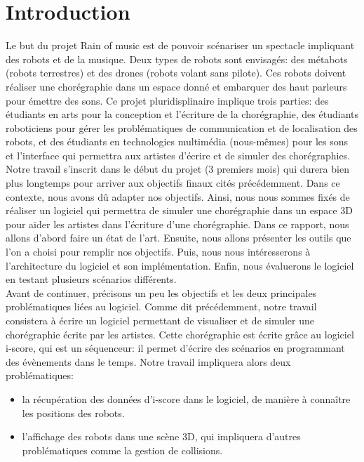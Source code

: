 \section*{Introduction}

Le but du projet Rain of music est de pouvoir scénariser un spectacle impliquant des robots et de la musique. Deux types de robots sont envisagés: des métabots (robots terrestres) et des drones (robots volant sans pilote). Ces robots doivent réaliser une chorégraphie dans un espace donné et embarquer des haut parleurs pour émettre des sons. Ce projet pluridisplinaire implique trois parties: des étudiants en arts pour la conception et l'écriture de la chorégraphie, des étudiants roboticiens pour gérer les problématiques de communication et de localisation des robots, et des étudiants en technologies multimédia (nous-mêmes) pour les sons et l'interface qui permettra aux artistes d'écrire et de simuler des chorégraphies. \\

Notre travail s'inscrit dans le début du projet (3 premiers mois) qui durera bien plus longtemps pour arriver aux objectifs finaux cités précédemment. Dans ce contexte, nous avons dû adapter nos objectifs. Ainsi, nous nous sommes fixés de réaliser un logiciel qui permettra de simuler une chorégraphie dans un espace 3D pour aider les artistes dans l'écriture d'une chorégraphie. Dans ce rapport, nous allons d'abord faire un état de l'art. Ensuite, nous allons présenter les outils que l'on a choisi pour remplir nos objectifs. Puis, nous nous intéresserons à l'architecture du logiciel et son implémentation. Enfin, nous évaluerons le logiciel en testant plusieurs scénarios différents. \\

Avant de continuer, précisons un peu les objectifs et les deux principales problématiques liées au logiciel.
Comme dit précédemment, notre travail consistera à écrire un logiciel permettant de visualiser et de simuler une chorégraphie écrite par les artistes. Cette chorégraphie est écrite grâce au logiciel i-score, qui est un séquenceur: il permet d'écrire des scénarios en programmant des évènements dans le temps. Notre travail impliquera alors deux problématiques: 
\begin{itemize}
\item la récupération des données d'i-score dans le logiciel, de manière à connaître les positions des robots.
\item l'affichage des robots dans une scène 3D, qui impliquera d'autres problématiques comme la gestion de collisions.
\end{itemize} 